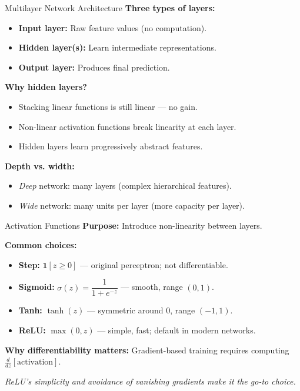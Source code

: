 \documentclass[10pt]{beamer}
\begin{document}
\begin{frame}{Multilayer Network Architecture}
    \textbf{Three types of layers:}
    \begin{itemize}
        \item \textbf{Input layer:} Raw feature values (no computation).
        \item \textbf{Hidden layer(s):} Learn intermediate representations.
        \item \textbf{Output layer:} Produces final prediction.
    \end{itemize}

    \vspace{0.2cm}
    \textbf{Why hidden layers?}
    \begin{itemize}
        \item Stacking linear functions is still linear --- no gain.
        \item Non-linear activation functions break linearity at each layer.
        \item Hidden layers learn progressively abstract features.
    \end{itemize}

    \vspace{0.2cm}
    \textbf{Depth vs. width:}
    \begin{itemize}
        \item \emph{Deep} network: many layers (complex hierarchical features).
        \item \emph{Wide} network: many units per layer (more capacity per layer).
    \end{itemize}
\end{frame}

\begin{frame}{Activation Functions}
    \textbf{Purpose:} Introduce non-linearity between layers.

    \vspace{0.2cm}
    \textbf{Common choices:}
    \begin{itemize}
        \item \textbf{Step:} $\mathbf{1}[z \geq 0]$ --- original perceptron; not differentiable.
        \item \textbf{Sigmoid:} $\sigma(z) = \dfrac{1}{1+e^{-z}}$ --- smooth, range $(0,1)$.
        \item \textbf{Tanh:} $\tanh(z)$ --- symmetric around 0, range $(-1, 1)$.
        \item \textbf{ReLU:} $\max(0, z)$ --- simple, fast; default in modern networks.
    \end{itemize}

    \vspace{0.2cm}
    \textbf{Why differentiability matters:} Gradient-based training requires computing $\frac{d}{dz}[\text{activation}]$.

    \vspace{0.2cm}
    \textit{ReLU's simplicity and avoidance of vanishing gradients make it the go-to choice.}
\end{frame}
\end{document}
